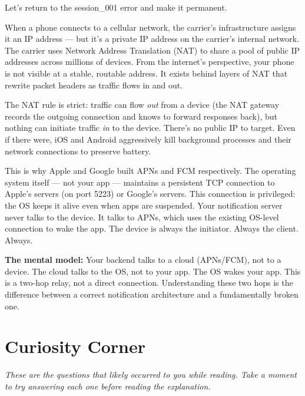 \documentclass[11pt,a4paper]{article}
\begin{document}
Let's return to the session\_001 error and make it permanent.

When a phone connects to a cellular network, the carrier's infrastructure assigns it an IP address --- but it's a private IP address on the carrier's internal network. The carrier uses Network Address Translation (NAT) to share a pool of public IP addresses across millions of devices. From the internet's perspective, your phone is not visible at a stable, routable address. It exists behind layers of NAT that rewrite packet headers as traffic flows in and out.

The NAT rule is strict: traffic can flow \emph{out} from a device (the NAT gateway records the outgoing connection and knows to forward responses back), but nothing can initiate traffic \emph{in} to the device. There's no public IP to target. Even if there were, iOS and Android aggressively kill background processes and their network connections to preserve battery.

This is why Apple and Google built APNs and FCM respectively. The operating system itself --- not your app --- maintains a persistent TCP connection to Apple's servers (on port 5223) or Google's servers. This connection is privileged: the OS keeps it alive even when apps are suspended. Your notification server never talks to the device. It talks to APNs, which uses the existing OS-level connection to wake the app. The device is always the initiator. Always the client. Always.

\begin{insightbox}
\textbf{The mental model:} Your backend talks to a cloud (APNs/FCM), not to a device. The cloud talks to the OS, not to your app. The OS wakes your app. This is a two-hop relay, not a direct connection. Understanding these two hops is the difference between a correct notification architecture and a fundamentally broken one.
\end{insightbox}

\newpage
\section*{Curiosity Corner}

\textit{These are the questions that likely occurred to you while reading. Take a moment to try answering each one before reading the explanation.}

\vspace{8pt}
\end{document}
